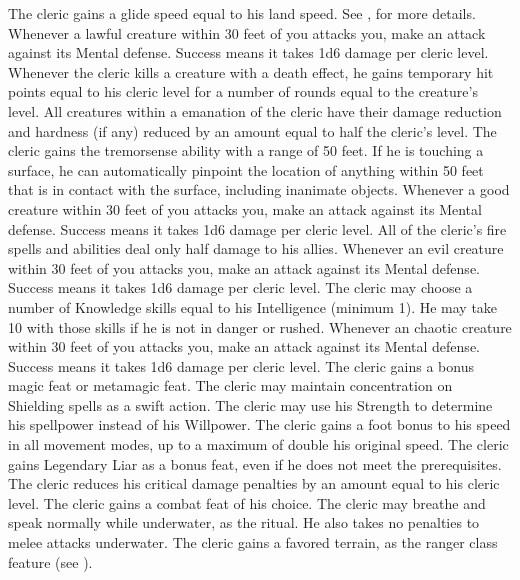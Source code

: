The cleric gains a glide speed equal to his land speed.
See , for more details.
Whenever a lawful creature within 30 feet of you attacks you, make an attack against its Mental defense.
Success means it takes 1d6 damage per cleric level.
Whenever the cleric kills a creature with a death effect, he gains temporary hit points equal to his cleric level for a number of rounds equal to the creature's level.
All creatures within a \areamed emanation of the cleric have their damage reduction and hardness (if any) reduced by an amount equal to half the cleric's level.
The cleric gains the tremorsense ability with a range of 50 feet.
If he is touching a surface, he can automatically pinpoint the location of anything within 50 feet that is in contact with the surface, including inanimate objects.
Whenever a good creature within 30 feet of you attacks you, make an attack against its Mental defense.
Success means it takes 1d6 damage per cleric level.
All of the cleric's fire spells and abilities deal only half damage to his allies.
Whenever an evil creature within 30 feet of you attacks you, make an attack against its Mental defense.
Success means it takes 1d6 damage per cleric level.
The cleric may choose a number of Knowledge skills equal to his Intelligence (minimum 1).
He may take 10 with those skills if he is not in danger or rushed.
Whenever an chaotic creature within 30 feet of you attacks you, make an attack against its Mental defense.
Success means it takes 1d6 damage per cleric level.
The cleric gains a bonus magic feat or metamagic feat.
The cleric may maintain concentration on Shielding spells as a swift action.
The cleric may use his Strength to determine his spellpower instead of his Willpower.
The cleric gains a  foot bonus to his speed in all movement modes, up to a maximum of double his original speed.
The cleric gains Legendary Liar as a bonus feat, even if he does not meet the prerequisites.
The cleric reduces his critical damage penalties by an amount equal to his cleric level.
The cleric gains a combat feat of his choice.
 The cleric may breathe and speak normally while underwater, as the 
ritual.
He also takes no penalties to melee attacks underwater.
The cleric gains a favored terrain, as the ranger class feature (see ).

